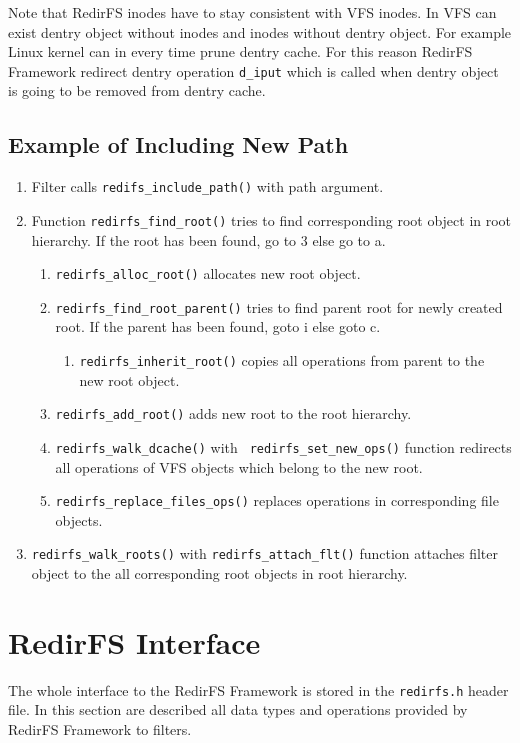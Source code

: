 Note that RedirFS inodes have to stay consistent with VFS inodes. In VFS can exist
dentry object without inodes and inodes without dentry object. For example Linux
kernel can in every time prune dentry cache. For this reason RedirFS Framework
redirect dentry operation \texttt{d\_iput} which is called when dentry object is going
to be removed from dentry cache.

\subsection{Example of Including New Path}
\begin{enumerate}
	\item Filter calls \texttt{redifs\_include\_path()} with path argument. 
	\item Function \texttt{redirfs\_find\_root()} tries to find corresponding root
		object in root hierarchy. If the root has been found,  go to 3 else
		go to a.
		\begin{enumerate}
			\item \texttt{redirfs\_alloc\_root()} allocates new root
				object.
			\item \texttt{redirfs\_find\_root\_parent()} tries to find
				parent root for newly created root. If the parent has
				been found, goto i else goto c.
				\begin{enumerate}
					\item \texttt{redirfs\_inherit\_root()} copies
						all operations from parent to the new
						root object.
				\end{enumerate}
			\item \texttt{redirfs\_add\_root()} adds new root to the root
				hierarchy.
			\item \texttt{redirfs\_walk\_dcache()} with \texttt{
				redirfs\_set\_new\_ops()} function redirects all operations of
				VFS objects which belong to the new root.
			\item \texttt{redirfs\_replace\_files\_ops()} replaces
				operations in corresponding file objects.
		\end{enumerate}
	\item \texttt{redirfs\_walk\_roots()} with \texttt{redirfs\_attach\_flt()}
		function attaches filter object to the all corresponding root objects in root
		hierarchy.
\end{enumerate}



\section{RedirFS Interface}
\label{lab:redirfs_interface}
The whole interface to the RedirFS Framework is stored in the \texttt{redirfs.h} header
file. In this section are described all data types and operations provided by RedirFS
Framework to filters.

